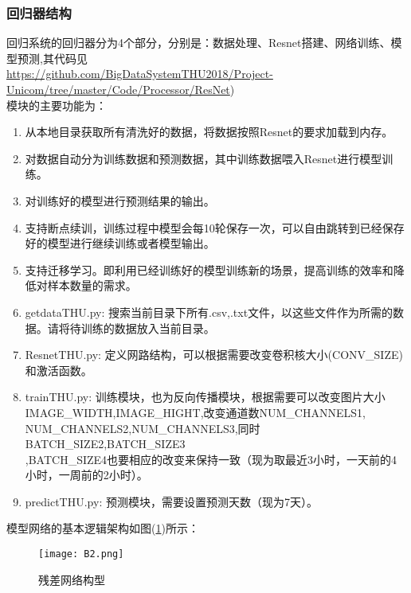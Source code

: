 \subsubsection*{回归器结构}
回归系统的回归器分为4个部分，分别是：数据处理、Resnet搭建、网络训练、模型预测,其代码见\\ \url{https://github.com/BigDataSystemTHU2018/Project-Unicom/tree/master/Code/Processor/ResNet})\\ 模块的主要功能为：
\begin{enumerate}
	\item 从本地目录获取所有清洗好的数据，将数据按照Resnet的要求加载到内存。
	\item 对数据自动分为训练数据和预测数据，其中训练数据喂入Resnet进行模型训练。
	\item 对训练好的模型进行预测结果的输出。
	\item 支持断点续训，训练过程中模型会每10轮保存一次，可以自由跳转到已经保存好的模型进行继续训练或者模型输出。
	\item 支持迁移学习。即利用已经训练好的模型训练新的场景，提高训练的效率和降低对样本数量的需求。
	\item getdataTHU.py: 搜索当前目录下所有.csv,.txt文件，以这些文件作为所需的数据。请将待训练的数据放入当前目录。
	\item ResnetTHU.py: 定义网路结构，可以根据需要改变卷积核大小(CONV\_SIZE)和激活函数。
	\item trainTHU.py: 训练模块，也为反向传播模块，根据需要可以改变图片大小
	IMAGE\_WIDTH,IMAGE\_HIGHT,改变通道数NUM\_CHANNELS1,\\
	NUM\_CHANNELS2,NUM\_CHANNELS3,同时BATCH\_SIZE2,BATCH\_SIZE3\\,BATCH\_SIZE4也要相应的改变来保持一致（现为取最近3小时，一天前的4小时，一周前的2小时）。
	\item predictTHU.py: 预测模块，需要设置预测天数（现为7天）。
\end{enumerate}
模型网络的基本逻辑架构如图(\ref{fig:B1})所示：
\begin{figure}[ht]
\centering
\texttt{[image: B2.png]}
\caption{残差网络构型}
\label{fig:B1}
\end{figure}
